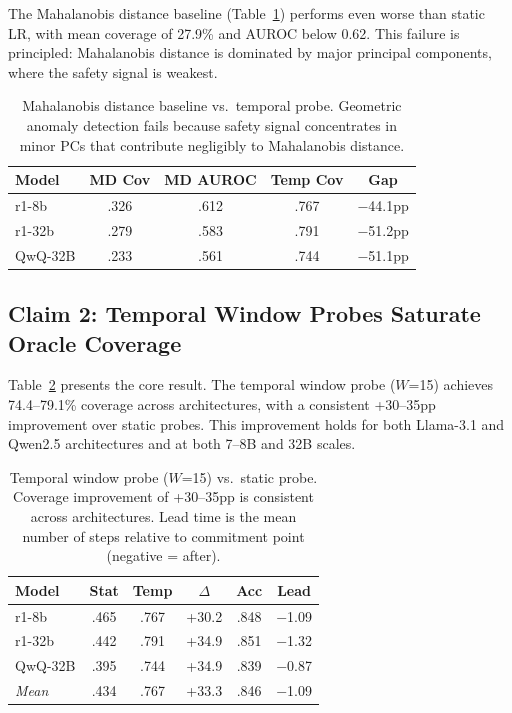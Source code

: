 \documentclass[11pt,a4paper]{article}
\begin{document}
The Mahalanobis distance baseline (Table~\ref{tab:mahalanobis}) performs even worse than static LR, with mean coverage of 27.9\% and AUROC below 0.62.
This failure is principled: Mahalanobis distance is dominated by major principal components, where the safety signal is weakest.

\begin{table}[t]
\centering
\small
\begin{tabular}{lcccc}
\toprule
\textbf{Model} & \textbf{MD Cov} & \textbf{MD AUROC} & \textbf{Temp Cov} & \textbf{Gap} \\
\midrule
r1-8b & .326 & .612 & .767 & $-$44.1pp \\
r1-32b & .279 & .583 & .791 & $-$51.2pp \\
QwQ-32B & .233 & .561 & .744 & $-$51.1pp \\
\bottomrule
\end{tabular}
\caption{Mahalanobis distance baseline vs.\ temporal probe. Geometric anomaly detection fails because safety signal concentrates in minor PCs that contribute negligibly to Mahalanobis distance.}
\label{tab:mahalanobis}
\end{table}

\subsection{Claim 2: Temporal Window Probes Saturate Oracle Coverage}

Table~\ref{tab:temporal} presents the core result.
The temporal window probe ($W$=15) achieves 74.4--79.1\% coverage across architectures, with a consistent +30--35pp improvement over static probes.
This improvement holds for both Llama-3.1 and Qwen2.5 architectures and at both 7--8B and 32B scales.

\begin{table}[t]
\centering
\small
\begin{tabular}{lccccc}
\toprule
\textbf{Model} & \textbf{Stat} & \textbf{Temp} & \textbf{$\Delta$} & \textbf{Acc} & \textbf{Lead} \\
\midrule
r1-8b & .465 & .767 & +30.2 & .848 & $-$1.09 \\
r1-32b & .442 & .791 & +34.9 & .851 & $-$1.32 \\
QwQ-32B & .395 & .744 & +34.9 & .839 & $-$0.87 \\
\midrule
\textit{Mean} & .434 & .767 & +33.3 & .846 & $-$1.09 \\
\bottomrule
\end{tabular}
\caption{Temporal window probe ($W$=15) vs.\ static probe.  Coverage improvement of +30--35pp is consistent across architectures.  Lead time is the mean number of steps relative to commitment point (negative = after).}
\label{tab:temporal}
\end{table}
\end{document}
